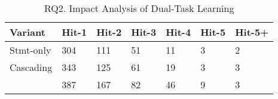 

\begin{table}[t]
	\caption{RQ2. Impact Analysis of Dual-Task Learning}
        \vspace{-9pt}
        \tabcolsep 3pt
	{\footnotesize
		\begin{center}
			\renewcommand{\arraystretch}{1}
			\begin{tabular}{p{1.3cm}<{\centering}|p{0.8cm}<{\centering}|p{0.8cm}<{\centering}|p{0.8cm}<{\centering}|p{0.8cm}<{\centering}|p{0.8cm}<{\centering}|p{0.8cm}<{\centering}}
				\hline
				Variant & Hit-1 & Hit-2 & Hit-3 & Hit-4 & Hit-5 & Hit-5+ \\	
				\hline
				Stmt-only & 304  & 111 & 51 & 11 & 3 & 2\\
				Cascading & 343 & 125 & 61 & 19 & 3 & 3 \\
				{\tool}	& 387 & 167 & 82 & 46 & 9 & 3\\
				\hline
			\end{tabular}
			\label{fig:rq2-1}
		\end{center}
	}
\end{table}

%			
